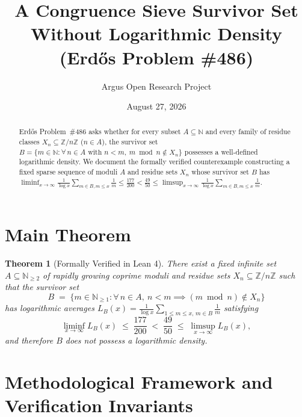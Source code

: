 \documentclass[10pt,reqno]{amsart}
\title[Non-Existence of Logarithmic Density for Congruence Sieve Survivors (Erd\H{o}s \#486)]
{A Congruence Sieve Survivor Set Without Logarithmic Density (Erd\H{o}s Problem \#486)}
\author{Argus Open Research Project}
\date{August 27, 2026}
\newtheorem{theorem}{Theorem}[section]
\theoremstyle{definition}
\begin{document}
\begin{abstract}
Erd\H{o}s Problem~\#486 asks whether for every subset $A\subseteq\mathbb{N}$ and every family of residue classes $X_n\subseteq\mathbb{Z}/n\mathbb{Z}$ ($n\in A$), the survivor set $B=\{m\in\mathbb{N} : \forall\,n\in A\text{ with }n<m,\ m\bmod n\notin X_n\}$ possesses a well-defined logarithmic density. We document the formally verified counterexample constructing a fixed sparse sequence of moduli $A$ and residue sets $X_n$ whose survivor set $B$ has $\liminf_{x\to\infty}\frac{1}{\log x}\sum_{m\in B, m\le x}\frac{1}{m}\le \frac{177}{200} < \frac{49}{50}\le \limsup_{x\to\infty}\frac{1}{\log x}\sum_{m\in B, m\le x}\frac{1}{m}$.
\end{abstract}
\maketitle
\section{Main Theorem}
\begin{theorem}[Formally Verified in Lean 4]
There exist a fixed infinite set $A\subseteq\mathbb{N}_{\ge 2}$ of rapidly growing coprime moduli and residue sets $X_n\subseteq\mathbb{Z}/n\mathbb{Z}$ such that the survivor set
\[
  B \;=\; \bigl\{m\in\mathbb{N}_{\ge 1} : \forall\, n\in A,\ n < m \implies (m\bmod n)\notin X_n\bigr\}
\]
has logarithmic averages $L_B(x) = \frac{1}{\log x}\sum_{1\le m\le x,\, m\in B}\frac{1}{m}$ satisfying
\[
  \liminf_{x\to\infty} L_B(x) \;\le\; \frac{177}{200} \;<\; \frac{49}{50} \;\le\; \limsup_{x\to\infty} L_B(x),
\]
and therefore $B$ does not possess a logarithmic density.
\end{theorem}

\section{Methodological Framework and Verification Invariants}
\end{document}
